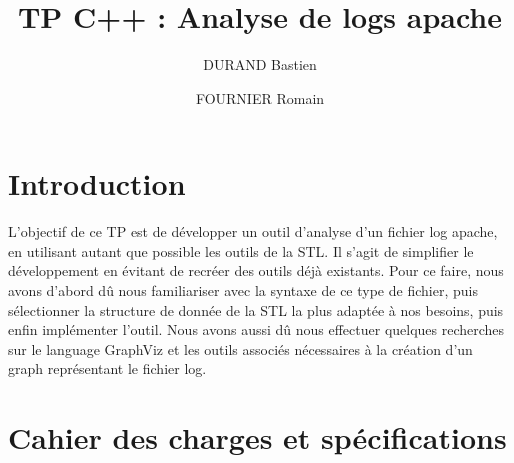 \documentclass[a4paper]{article}
\title{TP C++ \no 4 : 
\bigbreak
Analyse de logs apache
}
\author{DURAND Bastien \and FOURNIER Romain}
\begin{document}
\maketitle
\thispagestyle{fancy}

\tableofcontents
\smallbreak

\section*{Introduction}\noindent

	L'objectif de ce TP est de développer un outil d'analyse d'un fichier log apache, en utilisant autant que possible les outils de la STL. Il s'agit de simplifier le développement en évitant de recréer des outils déjà existants.
	Pour ce faire, nous avons d'abord dû nous familiariser avec la syntaxe de ce type de fichier, puis sélectionner la structure de donnée de la STL la plus adaptée à nos besoins, puis enfin implémenter l'outil.
	Nous avons aussi dû nous effectuer quelques recherches sur le language GraphViz et les outils associés nécessaires à la création d'un graph représentant le fichier log.
	
\newpage

\section{Cahier des charges et spécifications}\noindent
	
\end{document}
